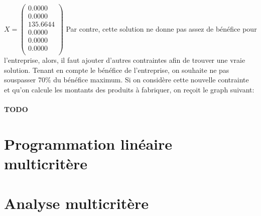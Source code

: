 \documentclass[a4paper, 11pt]{article}
\begin{document}
$X = \begin{pmatrix}
0.0000\\
0.0000\\
135.6644\\
0.0000\\
0.0000\\
0.0000\\
\end{pmatrix}$
\newline
Par contre, cette solution ne donne pas assez de bénéfice pour l’entreprise, alors, il faut ajouter d’autres contraintes afin de trouver une vraie solution.
\newline
Tenant en compte le bénéfice de l’entreprise, on souhaite ne pas souspasser 70\% du bénéfice maximum. Si on considère cette nouvelle contrainte et qu’on calcule les montants des produits à fabriquer, on reçoit le graph suivant:\\

\\ \textbf{TODO} \\

\section{Programmation linéaire multicritère}

\section{Analyse multicritère}
\end{document}

